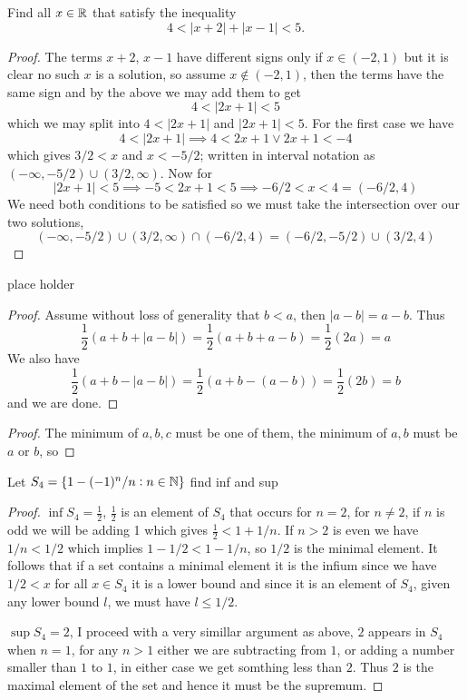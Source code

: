 \question 
Find all $x \in \mathbb{R}$ that satisfy the inequality 
\[ 4 < |x + 2| + |x - 1| < 5. \] 


\begin{proof}
    The terms $x + 2$, $x - 1$ have different signs only if $x \in (-2, 1)$ but it is clear 
    no such $x$ is a solution, so assume $x \notin (-2, 1)$, then the terms have the same sign and by the above we may add them 
    to get 
    \[4 < |2x +1 | < 5\]
    which we may split into $4 < |2x + 1| $ and $|2x + 1| < 5$. 
    For the first case we have 
    \[4 < |2x + 1| \implies 4 < 2x + 1 \vee 2x + 1 < -4\]
    which gives $3/2 < x$ and $x < -5/2$; written in interval notation as $(-\infty, -5/2) \cup (3/2, \infty)$. 
    Now for 
    \[|2x + 1| < 5 \implies -5 < 2x + 1 < 5 \implies -6/2 < x < 4 = (-6/2, 4)\]
    We need both conditions to be satisfied so we must take the intersection over our two solutions, 
    \[(-\infty, -5/2) \cup (3/2, \infty) \cap (-6/2, 4) = (-6/2, -5/2) \cup (3/2, 4)\]
\end{proof}

\question 
place holder 


\begin{alphaparts}
\questionpart

\begin{proof}
    Assume without loss of generality that $b < a$, then $|a - b| = a - b$. 
    Thus 
    \[\frac{1}{2}(a + b + |a - b|) = \frac{1}{2}(a + b + a -b ) = \frac{1}{2}(2a) = a\]
    We also have 
    \[\frac{1}{2}(a + b - |a - b|) = \frac{1}{2}(a + b -(a - b)) = \frac{1}{2}(2b) = b\]
    and we are done.  
\end{proof}

\questionpart 


\begin{proof}
    The minimum of $a, b, c$ must be one of them, the minimum of $a, b$ must be $a$ or $b$, so 

\end{proof}


\end{alphaparts}


\question 
Let $S_4 = \{1 - (-1)^n/n: n \in \mathbb{N}\}$ find inf and sup


\begin{proof}
$\inf S_4 = \frac{1}{2}$, $\frac{1}{2}$ is an element of $S_4$ that occurs for $n = 2$, for $n \neq 2$, if $n$ is odd we will be adding 1 which 
gives $\frac{1}{2} < 1 + 1/n$. If $n>2$ is even we have $1/n < 1/2$ which implies $1 - 1/2 < 1 - 1/n$, so $1/2$ is the minimal element. It follows that 
if a set contains a minimal element it is the infium since we have $1/2 < x$ for all $x \in S_4$ it is a lower bound and since it is an element of $S_4$, given any lower bound $l$, we must 
have $l \leq 1/2$. 

$\sup S_4 = 2$, I proceed with a very simillar argument as above, $2$ appears in $S_4$ when $n=1$, for any $n>1$ either we are subtracting from $1$, or adding a number smaller than $1$ to $1$, in either case 
we get somthing less than $2$. Thus $2$ is the maximal element of the set and hence it must be the supremum. 
\end{proof}


